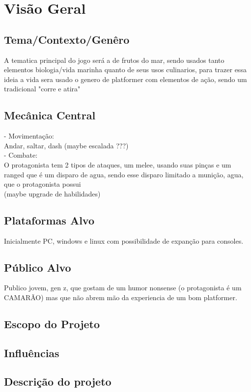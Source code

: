 
\section{Visão Geral}%
    \subsection{Tema/Contexto/Genêro}%
    A tematica principal do jogo será a de frutos do mar, sendo usados tanto elementos biologia/vida marinha quanto de seus usos culinarios, para trazer essa ideia a vida sera usado o genero de platformer com elementos de ação, sendo um tradicional "corre e atira" 

    \subsection{Mecânica Central}%
- Movimentação:\\
    Andar, saltar, dash (maybe escalada ???)\\
- Combate:\\
    O protagonista tem 2 tipos de ataques, um melee, usando suas pinças e um ranged que é um disparo de agua, sendo esse disparo limitado a munição, agua, que o protagonista possui \\
    (maybe upgrade de habilidades)\\

    \subsection{Plataformas Alvo}%
Inicialmente PC, windows e linux com possibilidade de expanção para consoles.
    \subsection{Público Alvo}%
Publico jovem, gen z, que gostam de um humor nonsense (o protagonista é um CAMARÃO) mas que não abrem mão da experiencia de um bom platformer.
    \subsection{Escopo do Projeto}%
    \subsection{Influências}%
    \subsection{Descrição do projeto}%
